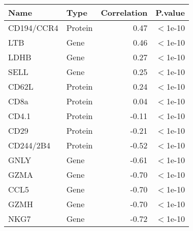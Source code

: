\begin{tabular}{llrl}
  \hline
Name & Type & Correlation & P.value \\ 
  \hline
CD194/CCR4 & Protein & 0.47 & $<$1e-10 \\ 
  LTB & Gene & 0.46 & $<$1e-10 \\ 
  LDHB & Gene & 0.27 & $<$1e-10 \\ 
  SELL & Gene & 0.25 & $<$1e-10 \\ 
  CD62L & Protein & 0.24 & $<$1e-10 \\ 
  CD8a & Protein & 0.04 & $<$1e-10 \\ 
  CD4.1 & Protein & -0.11 & $<$1e-10 \\ 
  CD29 & Protein & -0.21 & $<$1e-10 \\ 
  CD244/2B4 & Protein & -0.52 & $<$1e-10 \\ 
  GNLY & Gene & -0.61 & $<$1e-10 \\ 
  GZMA & Gene & -0.70 & $<$1e-10 \\ 
  CCL5 & Gene & -0.70 & $<$1e-10 \\ 
  GZMH & Gene & -0.70 & $<$1e-10 \\ 
  NKG7 & Gene & -0.72 & $<$1e-10 \\ 
   \hline
\end{tabular}
